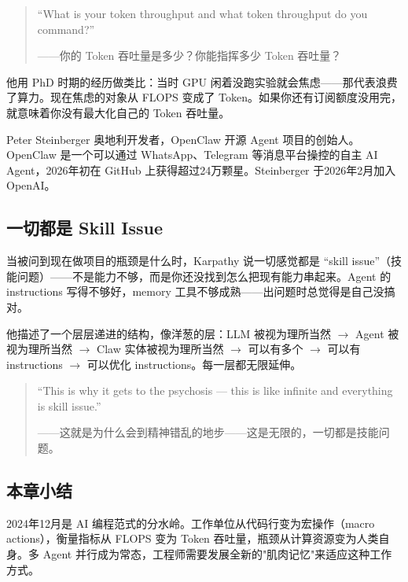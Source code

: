 \begin{quote}
``What is your token throughput and what token throughput do you command?''

——你的 Token 吞吐量是多少？你能指挥多少 Token 吞吐量？
\end{quote}

他用 PhD 时期的经历做类比：当时 GPU 闲着没跑实验就会焦虑——那代表浪费了算力。现在焦虑的对象从 FLOPS 变成了 Token。如果你还有订阅额度没用完，就意味着你没有最大化自己的 Token 吞吐量。

\begin{knowledgebox}{Peter Steinberger}
奥地利开发者，OpenClaw 开源 Agent 项目的创始人。OpenClaw 是一个可以通过 WhatsApp、Telegram 等消息平台操控的自主 AI Agent，2026年初在 GitHub 上获得超过24万颗星。Steinberger 于2026年2月加入 OpenAI。
\end{knowledgebox}

\subsection{一切都是 Skill Issue}

当被问到现在做项目的瓶颈是什么时，Karpathy 说一切感觉都是 ``skill issue''（技能问题）——不是能力不够，而是你还没找到怎么把现有能力串起来。Agent 的 instructions 写得不够好，memory 工具不够成熟——出问题时总觉得是自己没搞对。

他描述了一个层层递进的结构，像洋葱的层：LLM 被视为理所当然 $\rightarrow$ Agent 被视为理所当然 $\rightarrow$ Claw 实体被视为理所当然 $\rightarrow$ 可以有多个 $\rightarrow$ 可以有 instructions $\rightarrow$ 可以优化 instructions。每一层都无限延伸。

\begin{quote}
``This is why it gets to the psychosis — this is like infinite and everything is skill issue.''

——这就是为什么会到精神错乱的地步——这是无限的，一切都是技能问题。
\end{quote}

\subsection{本章小结}

2024年12月是 AI 编程范式的分水岭。工作单位从代码行变为宏操作（macro actions），衡量指标从 FLOPS 变为 Token 吞吐量，瓶颈从计算资源变为人类自身。多 Agent 并行成为常态，工程师需要发展全新的"肌肉记忆"来适应这种工作方式。


